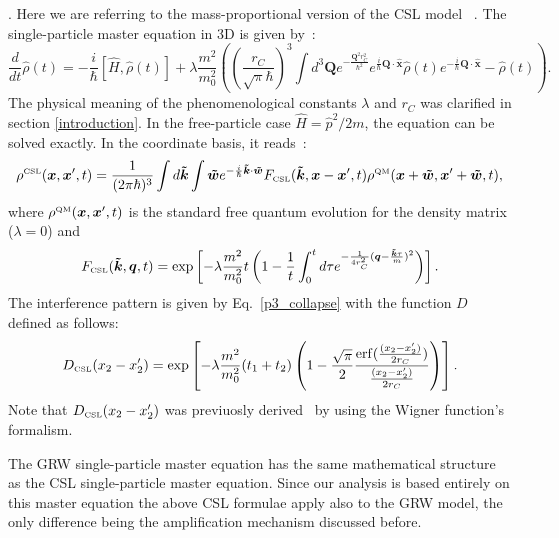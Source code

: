 \documentclass[12pt,groupedaddress,pra,aps]{revtex4-1}
\DeclareMathOperator\erf{erf}
\begin{document}
. Here we are referring to the mass-proportional version of the CSL model ~\cite{PhysRevLett.73.1}. The single-particle master equation in 3D is given by~\cite{PhysRevA.90.062105}:
\begin{equation}\label{csl_equation}
\frac{d }{d t}\hat{\rho}(t)= 
-\frac{i}{\hbar}\left[\hat{H},\hat{\rho}(t) \right] 
+\lambda \frac{m^2}{m_0^2}  \left( \left(\frac{r_C}{\sqrt{\pi}\hbar}\right)^3 
\int d^3 \bm{Q} e^{-\frac{\bm{Q}^2r_C^2}{\hbar^2}}
e^{\frac{i}{\hbar} \bm{Q} \cdot \hat{\bm{x}}}\hat{\rho}(t)e^{-\frac{i}{\hbar} \bm{Q} \cdot \hat{\bm{x}}}- \hat{\rho}(t)\right).
\end{equation}
The physical meaning of the phenomenological constants $\lambda$ and $r_C$ was clarified in section \ref{introduction}. In the free-particle case $\hat{H} = \hat{p}^2/2m$, the equation can be solved exactly. In the coordinate basis, it reads~\cite{PhysRevD.34.470}:
\begin{equation}\label{rho_csl}
\rho^{\text{\tiny CSL}}(\bm{x},\bm{x}',t)= \frac{1}{(2\pi\hbar)^3} \int d \bm{\tilde{k}}  \int \bm{\tilde{w}} e^{-\frac{i}{\hbar}\bm{\tilde{k}} \cdot \bm{\tilde{w}}} 
 F_{\text{\tiny CSL}}(\bm{\tilde{k}},\bm{x}-\bm{x}',t) \rho^{\text{\tiny QM}}(\bm{x}+\bm{\tilde{w}},\bm{x}'+\bm{\tilde{w}},t),
\end{equation}
where $\rho^{\text{\tiny QM}}(\bm{x},\bm{x}',t)$ is the standard free quantum evolution for the density matrix ($\lambda = 0$) and 
\begin{equation}\label{FF}
F_{\text{\tiny CSL}}(\bm{\tilde{k}},\bm{q},t)= \exp\left[-\lambda \frac{m^2}{m_0^2} t \left(1-\frac{1}{t}\int_0^t d\tau e^{-\frac{1}{4r_C^2}(\bm{q}-\frac{\bm{\tilde{k}}\tau}{m})^2} \right) \right].
\end{equation}
The interference pattern is given by Eq.~\eqref{p3_collapse} with the function $D$ defined as follows:
\begin{equation}\label{cfunc}
D_{\text{\tiny CSL}}(x_2-x_2')=\exp \left[-\lambda \frac{m^2}{m_0^2} (t_1+t_2)
\left(1-\frac{\sqrt{\pi}}{2}\frac{\erf (\frac{(x_2-x_2')}{2r_C})}{\frac{(x_2-x_2')}{2r_C}} \right) \right].
\end{equation}
Note that $D_{\text{\tiny CSL}}(x_2-x_2')$ was previuosly derived~\cite{PhysRevA.83.043621,PhysRevA.70.053608, PhysRevA.73.052102} by using the Wigner function's formalism. 

The GRW single-particle master equation has the same mathematical structure as the CSL single-particle master equation. Since our analysis is based entirely on this master equation the above CSL formulae apply also to the GRW model, the only difference being the amplification mechanism discussed before.  \\ \\
\end{document}

